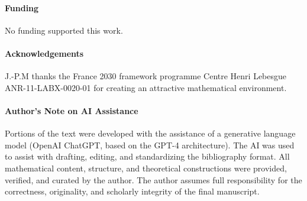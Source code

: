 \documentclass[11pt]{article}
\theoremstyle{remark}
\begin{document}
\vskip 12pt

\paragraph{\bf Funding} No funding supported this work.

\vskip 12pt

\paragraph{\bf Acknowledgements} J.-P.M thanks the France 2030 framework programme Centre Henri Lebesgue ANR-11-LABX-0020-01 
for creating an attractive mathematical environment.

\vskip 12pt

\paragraph{\bf Author's Note on AI Assistance}
Portions of the text were developed with the assistance of a generative language model (OpenAI ChatGPT, based on the GPT-4 architecture). The AI was used to assist with drafting, editing, and standardizing the bibliography format. All mathematical content, structure, and theoretical constructions were provided, verified, and curated by the author. The author assumes full responsibility for the correctness, originality, and scholarly integrity of the final manuscript.
\end{document}
